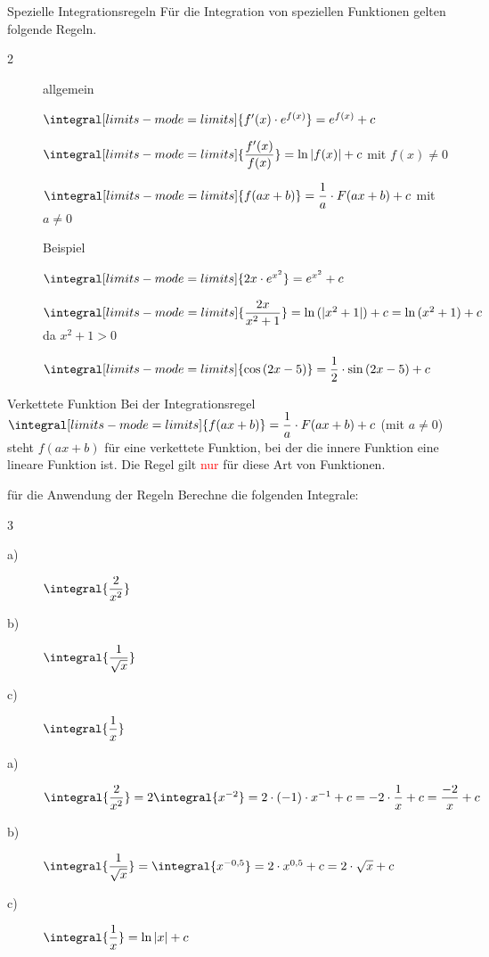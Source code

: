 \begin{merke}{Spezielle Integrationsregeln}{}
    Für die Integration von speziellen Funktionen gelten folgende Regeln.
    \begin{multicols}{2}
        \begin{description}
            \item[] allgemein 
            \item[]  $\integral[limits-mode=limits]{f'(x) \cdot e^{f(x)}}= e^{f(x)} +c$
            \item[]  $\integral[limits-mode=limits]{\dfrac{f'(x)}{f(x)}}= \ln{|f(x)|} +c$ mit $f(x) \neq 0$
            \item[] $\integral[limits-mode=limits]{f(ax+b)}= \dfrac{1}{a}\cdot F(ax+b) +c$ mit $a\neq 0$
            \item[] Beispiel 
            \item[] $\integral[limits-mode=limits]{2x \cdot e^{x^2}}= e^{x^2} +c$ 
            \item[] $\integral[limits-mode=limits]{\dfrac{2x}{x^2+1}}= \ln{(|x^2+1|)} +c = \ln{(x^2+1)} +c$ da $x^2 + 1 >0$
            \item[] $\integral[limits-mode=limits]{\cos{(2x-5)}} = \dfrac{1}{2} \cdot \sin{(2x-5)} +c $ 
        \end{description}
    \end{multicols}
\end{merke}
\begin{b8d}{Verkettete Funktion}{}
    Bei der Integrationsregel $\integral[limits-mode=limits]{f(ax+b)}= \dfrac{1}{a}\cdot F(ax+b) +c$ (mit $a\neq 0$) steht $f(ax + b)$ für eine verkettete Funktion, bei der die innere Funktion eine lineare Funktion ist. Die Regel gilt \textcolor{red}{nur} für diese Art von Funktionen.
\end{b8d}
\begin{bsp}{für die Anwendung der Regeln}{}
    Berechne die folgenden Integrale:
    \begin{multicols}{3}
    \begin{description}
        \item[a)] $\integral{\dfrac{2}{x^2}}$
        \item[b)] $\integral{\dfrac{1}{\sqrt{x}}}$
        \item[c)] $\integral{\dfrac{1}{x}}$
    \end{description}   
    \end{multicols}
    \begin{description}
      \item[a)] $\integral{\dfrac{2}{x^2}} = 2\integral{x^{-2}} = 2 \cdot (-1) \cdot x^{-1} +c = -2\cdot \dfrac{1}{x} +c = \dfrac{-2}{x} +c$ 
      \item[b)] $\integral{\dfrac{1}{\sqrt{x}}} = \integral{x^{-0,5}} = 2\cdot x^{0,5} + c = 2\cdot \sqrt{x} + c$ 
      \item[c)] $\integral{\dfrac{1}{x}} = \ln{|x|} + c$  
    \end{description}
    \end{bsp}
